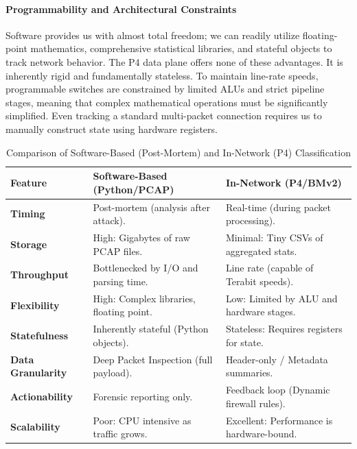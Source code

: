 \documentclass[11pt,a4paper]{article}
\begin{document}
\paragraph{Programmability and Architectural Constraints}
Software provides us with almost total freedom; we can readily utilize floating-point mathematics, comprehensive statistical libraries, and stateful objects to track network behavior. The P4 data plane offers none of these advantages. It is inherently rigid and fundamentally stateless. To maintain line-rate speeds, programmable switches are constrained by limited ALUs and strict pipeline stages, meaning that complex mathematical operations must be significantly simplified. Even tracking a standard multi-packet connection requires us to manually construct state using hardware registers.

\begin{table}
    \centering
    \small
    \caption{Comparison of Software-Based (Post-Mortem) and In-Network (P4) Classification}
    \label{tab:methodology_comparison}
    \begin{tabular}{@{} l p{5cm} p{5cm} @{}}
        \toprule
        \textbf{Feature} & \textbf{Software-Based (Python/PCAP)} & \textbf{In-Network (P4/BMv2)} \\
        \midrule
        \textbf{Timing} & Post-mortem (analysis after attack). & Real-time (during packet processing). \\
        \textbf{Storage} & High: Gigabytes of raw PCAP files. & Minimal: Tiny CSVs of aggregated stats. \\
        \textbf{Throughput} & Bottlenecked by I/O and parsing time. & Line rate (capable of Terabit speeds). \\
        \textbf{Flexibility} & High: Complex libraries, floating point. & Low: Limited by ALU and hardware stages. \\
        \textbf{Statefulness} & Inherently stateful (Python objects). & Stateless: Requires registers for state. \\
        \textbf{Data Granularity} & Deep Packet Inspection (full payload). & Header-only / Metadata summaries. \\
        \textbf{Actionability} & Forensic reporting only. & Feedback loop (Dynamic firewall rules). \\
        \textbf{Scalability} & Poor: CPU intensive as traffic grows. & Excellent: Performance is hardware-bound. \\
        \bottomrule
    \end{tabular}
\end{table}
\end{document}

